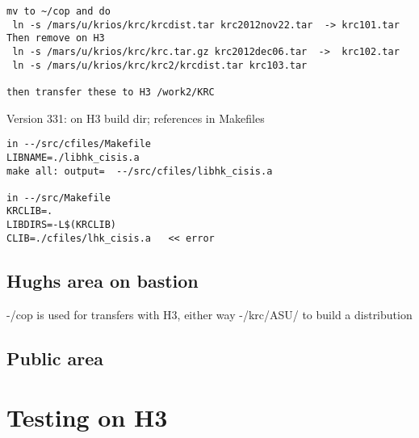 \documentclass{article}
\begin{document}
\begin{verbatim}
mv to ~/cop and do 
 ln -s /mars/u/krios/krc/krcdist.tar krc2012nov22.tar  -> krc101.tar Then remove on H3
 ln -s /mars/u/krios/krc/krc.tar.gz krc2012dec06.tar  ->  krc102.tar
 ln -s /mars/u/krios/krc/krc2/krcdist.tar krc103.tar

then transfer these to H3 /work2/KRC

\end{verbatim}

Version 331: on H3 build dir; references in Makefiles
\vspace{-3.mm} 
\begin{verbatim}
in --/src/cfiles/Makefile 
LIBNAME=./libhk_cisis.a
make all: output=  --/src/cfiles/libhk_cisis.a

in --/src/Makefile
KRCLIB=.
LIBDIRS=-L$(KRCLIB)
CLIB=./cfiles/lhk_cisis.a   << error
\end{verbatim}

\subsection{Hughs area on bastion}
-/cop is used for transfers with H3, either way
-/krc/ASU/ to build a distribution

\subsection{Public area}

\pagebreak
\section{Testing on H3}
\end{document}
